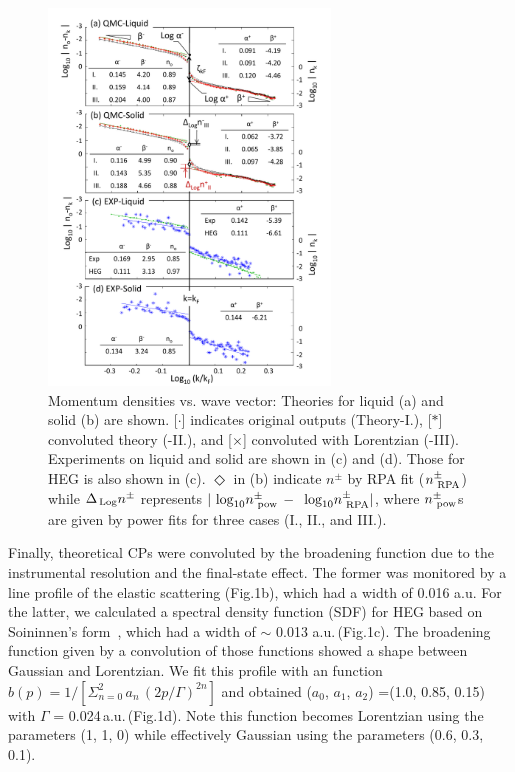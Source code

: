\documentclass[twocolumn,showpacs,showkeys,fleqn,prl,superscriptaddress]{revtex4}%
\newcommand{\nn}[1]{\textnormal{ #1}}
\begin{document}
\begin{figure}
\includegraphics[bb= 70 10 500 700, width=7.5cm]{fig3.pdf}
\caption{Momentum densities vs. wave vector:  Theories for liquid (a) and solid (b) are shown. [$\cdot$] indicates original outputs (Theory-I.), [$*$]  convoluted theory (-II.), and [$\times$] convoluted with Lorentzian (-III).  Experiments on liquid and solid are shown in (c) and (d). Those for HEG is also shown in (c).
 $\Diamond$ in (b) indicate $n^{\pm}$ by RPA fit ($n^{\pm}_{\nn{RPA}}$)  
while $\Delta_{\!\nn{Log}} n^{\pm}$ represents $ | \nn{log}_{10} n^{\pm}_{\nn{pow}} \,-\, \nn{log}_{10} n^{\pm}_{\nn{RPA}} | $,
where $ n^{\pm}_{\nn{pow}} $s are given by power fits for three cases (I., II., and III.).
} 
\label{Fig.3}
\end{figure}

Finally, theoretical CPs were convoluted by the broadening function due to the instrumental resolution and the final-state effect.
The former was monitored by a line profile of the elastic scattering (Fig.1b), which had a width of 0.016 a.u.
For the latter, we calculated a spectral density function (SDF) for HEG based on Soininnen's form~\cite{soi01}, which had a width of $\sim$ 0.013 a.u.\,(Fig.1c).
The broadening function given by a convolution of those functions showed a shape between Gaussian and Lorentzian.
We fit this profile with an function $b(p) =1/ [ \Sigma_{n=0}^{2}\,a_n\,(2p / \Gamma )^{2n} ]$ and obtained ($a_0$, $a_1$, $a_2$) =(1.0, 0.85, 0.15) with $\Gamma$ = 0.024\,a.u.\,(Fig.1d).
Note this function becomes Lorentzian using the parameters (1, 1, 0) while effectively Gaussian using the parameters (0.6, 0.3, 0.1).
\end{document}
